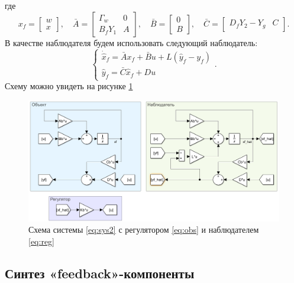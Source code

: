 где
\begin{equation*}
    x_f=\begin{bmatrix}
        w\\x
    \end{bmatrix},\quad
    \bar A=\begin{bmatrix}
        \Gamma_w & 0\\ B_fY_1&A
    \end{bmatrix},\quad
    \bar B = \begin{bmatrix}
        0\\B
    \end{bmatrix},\quad
    \bar C = \begin{bmatrix}
        D_fY_2-Y_g&C
    \end{bmatrix}.
\end{equation*}
В качестве наблюдателя будем использовать следующий наблюдатель:
\begin{equation}
    \label{eq:obs}
    \begin{cases}
        \dot{\hat x}_f=\bar Ax_f+\bar Bu+L(\hat y_f-y_f)\\
        \hat y_f=\bar C\hat x_f+Du
    \end{cases}.
\end{equation}
Схему можно увидеть на рисунке \ref{fig:slx}
\begin{figure}[H]
    \centering
    \includegraphics[width=\linewidth]{figs/2slx.png}
    \caption{Схема системы \eqref{eq:sys2} с регулятором \eqref{eq:obs}
    и наблюдателем \eqref{eq:reg}}
    \label{fig:slx}
\end{figure}


\subsection{Синтез «feedback»-компоненты}

